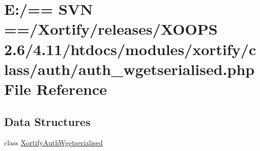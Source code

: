 \hypertarget{auth__wgetserialised_8php}{\section{E\-:/== S\-V\-N ==/\-Xortify/releases/\-X\-O\-O\-P\-S 2.6/4.11/htdocs/modules/xortify/class/auth/auth\-\_\-wgetserialised.php File Reference}
\label{auth__wgetserialised_8php}
}
\subsection*{Data Structures}
\begin{DoxyCompactItemize}
\item 
class \hyperlink{class_xortify_auth_wgetserialised}{Xortify\-Auth\-Wgetserialised}
\end{DoxyCompactItemize}

